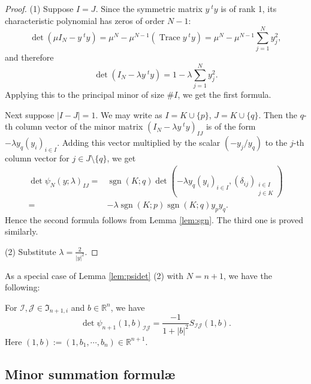 \begin{proof}
(1) \enspace
Suppose $I=J$.  
Since the symmetric matrix $y \ {}^{t\!}y$ is of rank 1,
 its characteristic polynomial has zeros of order $N-1$:
\[
    \det (\mu I_N - y \ {}^{t\!}y)
   =\mu^N-\mu^{N-1}(\operatorname{Trace} y \ {}^{t\!}y)
   =\mu^N-\mu^{N-1}\sum_{j=1}^{N} y_j^2, 
\]
 and therefore
\[
    \det (I_N - \lambda y \ {}^{t\!}y)= 1- \lambda \sum_{j=1}^{N}y_j^2.  
\]
Applying this to the principal minor
 of size $\# I$,
 we get the first formula.  

\par\indent
Next suppose $|I-J|=1$.  
We may write as $I=K \cup \{p\}$, $J=K \cup \{q\}$.  
Then the $q$-th column vector of the minor matrix
 $(I_N - \lambda y \ {}^{t\!}y)_{IJ}$
 is of the form $-\lambda y_q(y_i)_{i\in I}$.  
Adding this vector multiplied by the scalar
 $(- y_j/y_q)$ to the $j$-th column vector
 for $j \in J \setminus \{q\}$,
 we get 
\begin{align*}
  \det \psi_N(y; \lambda)_{I J}
  =&
  \operatorname{sgn}(K;q) 
  \det (-\lambda y_q(y_i)_{i \in I}, (\delta_{i j})_{\substack{i \in I \\ j \in K}})
\\
=&
-\lambda \operatorname{sgn}(K;p)
 \operatorname{sgn}(K;q)
 y_p y_q.  
\end{align*}
Hence the second formula follows from Lemma \ref{lem:sgn}.  
The third one is proved similarly.  
\par\noindent
(2)\enspace
Substitute $\lambda=\frac{2}{|y|^2}$.  
\end{proof}
As a special case of Lemma \ref{lem:psidet} (2) with $N=n+1$, 
 we have the following:
\begin{lemma}
\label{lem:psid}
For ${\mathcal{I}}, {\mathcal{J}} \in {\mathfrak{I}}_{n+1,i}$
 and $b \in {\mathbb{R}}^n$, 
 we have
\[
 \det \psi_{n+1}(1,b)_{{\mathcal{I}} {\mathcal{J}}}
 =
\frac{-1}{1+|b|^2} S_{{\mathcal{I}} {\mathcal{J}}}(1,b).  
\]
Here $(1,b):=(1,b_1, \cdots, b_n) \in {\mathbb{R}}^{n+1}$.  
\end{lemma}




\subsection{Minor summation formul{\ae}}
\label{subsec:minorsum}



